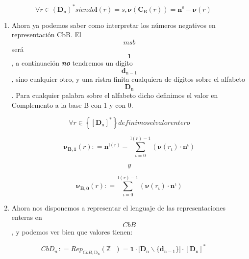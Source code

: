 \documentclass[
]{article}
\begin{document}
\begin{enumerate}
\begin{enumerate}
\begin{enumerate}
      \[\forall{\mathit{r} \in \left( \mathbf{D}_{\mathbf{\mathrm{n}}} \right)^{\ast}}\mathit{siendo}\mathbf{l}{{(\mathit{r})} = s},\mathbf{\nu}{{({\mathbf{C}_{\mathbf{\mathrm{Β}}}{(\mathit{r})}})} = {\mathbf{n}^{\mathbf{\mathrm{s}}} - \mathbf{\nu}}}{(\mathit{r})}\]

      \begin{enumerate}
      \def\labelenumiv{\arabic{enumiv}.}
      \setcounter{enumiv}{1}
      \item
        Ahora ya podemos saber como interpretar los números negativos en
        represen\-tación CbB. El \[\mathbf{\mathit{msb}}\]será
        \[\mathbf{1}\], a continuación \emph{\textbf{no}} tendremos un
        dígito \[\mathbf{d}_{\mathbf{\mathrm{n - 1}}}\], sino cualquier
        otro, y una ristra finita cualquiera de dígitos sobre el
        alfabeto \[\mathbf{D}_{\mathbf{\mathrm{n}}}\]. Para cualquier
        palabra sobre el alfabeto dicho definimos el valor en
        Complemento a la base B con 1 y con 0.

        \[\forall{\mathit{r} \in \left\{ \left\lbrack \mathbf{D}_{\mathbf{\mathrm{n}}} \right\rbrack^{\mathbf{\mathrm{\ast}}} \right\}}\mathit{definimos}\mathit{el}\mathit{valor}\mathit{entero}\]

        \[\mathbf{\nu_{Β,1}}{(\mathit{r})}{: =}{\mathbf{n}^{\mathbf{\mathrm{l}}{(\mathit{r})}} - {\sum\limits_{\mathbf{\mathrm{\iota = 0}}}^{{\mathbf{\mathrm{l}}{(\mathit{r})}} - \mathbf{\mathrm{1}}}{({\mathbf{\nu}{{(\mathit{r}_{\mathbf{\mathrm{\iota}}})} \cdot \mathbf{n}^{\mathbf{\mathrm{\iota}}}}})}}}\]

        \[y\]

        \[\mathbf{\nu_{Β,0}}{(\mathit{r})}{: =}{\sum\limits_{\mathbf{\mathrm{\iota = 0}}}^{{\mathbf{\mathrm{l}}{(\mathit{r})}} - \mathbf{\mathrm{1}}}{({\mathbf{\nu}{{(\mathit{r}_{\mathbf{\mathrm{\iota}}})} \cdot \mathbf{n}^{\mathbf{\mathrm{\iota}}}}})}}\]
      \item
        Ahora nos disponemos a representar el lenguaje de las
        representaciones ente\-ras en \[CbB\], y podemos ver bien que
        valores tienen:
      \end{enumerate}

      \[\mathit{CbD}_{n}^{-}{: =}\mathit{Rep}_{\mathit{CbB},\mathbf{\mathrm{D}}_{\mathbf{\mathrm{n}}}}{(\mathbb{Z}^{\mathbf{\mathrm{-}}})}{=}{{\mathbf{1} \cdot {\lbrack{\mathbf{D}_{\mathbf{\mathrm{n}}} \smallsetminus {\{\mathbf{d}_{\mathbf{\mathrm{n - 1}}}\}}}\rbrack}} \cdot \left\lbrack \mathbf{D}_{\mathbf{\mathrm{n}}} \right\rbrack^{\mathbf{\mathrm{\ast}}}}\]


\end{enumerate}
\end{enumerate}
\end{enumerate}
\end{document}

